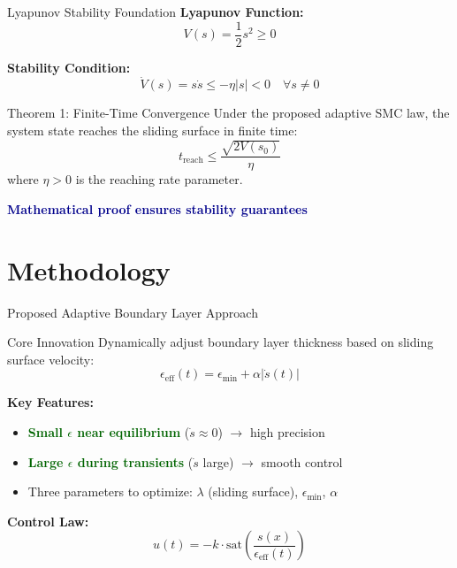 \documentclass[10pt,aspectratio=169]{beamer}
\newcommand{\highlight}[1]{\textcolor{darkblue}{\textbf{#1}}}
\newcommand{\emphgreen}[1]{\textcolor{darkgreen}{\textbf{#1}}}
\begin{document}
\begin{frame}{Lyapunov Stability Foundation}
\textbf{Lyapunov Function:}
\[
V(s) = \frac{1}{2} s^2 \geq 0
\]

\textbf{Stability Condition:}
\[
\dot{V}(s) = s \dot{s} \leq -\eta |s| < 0 \quad \forall s \neq 0
\]

\vspace{0.3cm}
\begin{block}{Theorem 1: Finite-Time Convergence}
Under the proposed adaptive SMC law, the system state reaches the sliding surface in finite time:
\[
t_{\text{reach}} \leq \frac{\sqrt{2V(s_0)}}{\eta}
\]
where $\eta > 0$ is the reaching rate parameter.
\end{block}

\vspace{0.3cm}
\centering
\highlight{Mathematical proof ensures stability guarantees}
\end{frame}

\section{Methodology}

\begin{frame}{Proposed Adaptive Boundary Layer Approach}
\begin{block}{Core Innovation}
Dynamically adjust boundary layer thickness based on sliding surface velocity:
\[
\epsilon_{\text{eff}}(t) = \epsilon_{\min} + \alpha |\dot{s}(t)|
\]
\end{block}

\textbf{Key Features:}
\begin{itemize}
    \item \emphgreen{Small $\epsilon$ near equilibrium} ($\dot{s} \approx 0$) $\rightarrow$ high precision
    \item \emphgreen{Large $\epsilon$ during transients} ($\dot{s}$ large) $\rightarrow$ smooth control
    \item Three parameters to optimize: $\lambda$ (sliding surface), $\epsilon_{\min}$, $\alpha$
\end{itemize}

\vspace{0.3cm}
\textbf{Control Law:}
\[
u(t) = -k \cdot \text{sat}\left(\frac{s(x)}{\epsilon_{\text{eff}}(t)}\right)
\]

\vspace{0.3cm}
\centering
{}
\end{frame}
\end{document}

